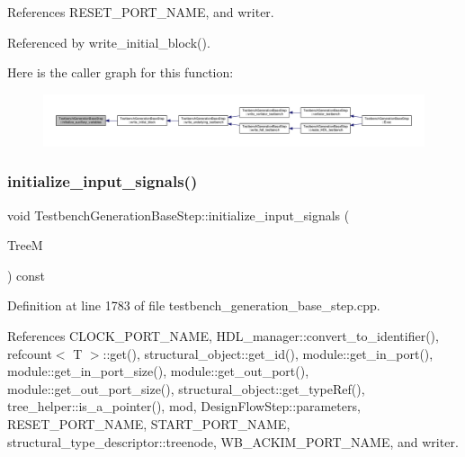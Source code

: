 References R\+E\+S\+E\+T\+\_\+\+P\+O\+R\+T\+\_\+\+N\+A\+ME, and writer.



Referenced by write\+\_\+initial\+\_\+block().

Here is the caller graph for this function\+:
\nopagebreak
\begin{figure}[H]
\begin{center}
\leavevmode
\includegraphics[width=350pt]{dc/d02/classTestbenchGenerationBaseStep_a1055ee6f17948449e8ab78c798f4440c_icgraph}
\end{center}
\end{figure}
\mbox{\label{classTestbenchGenerationBaseStep_ab4bb94d28070dd729e236fbb1810c356}} 
\subsubsection{\texorpdfstring{initialize\+\_\+input\+\_\+signals()}{initialize\_input\_signals()}}
{\footnotesize\ttfamily void Testbench\+Generation\+Base\+Step\+::initialize\+\_\+input\+\_\+signals (\begin{DoxyParamCaption}\item[{const \hyperlink{tree__manager_8hpp_a792e3f1f892d7d997a8d8a4a12e39346}{tree\+\_\+manager\+Const\+Ref}}]{TreeM }\end{DoxyParamCaption}) const\hspace{0.3cm}{\ttfamily [protected]}}



Definition at line 1783 of file testbench\+\_\+generation\+\_\+base\+\_\+step.\+cpp.



References C\+L\+O\+C\+K\+\_\+\+P\+O\+R\+T\+\_\+\+N\+A\+ME, H\+D\+L\+\_\+manager\+::convert\+\_\+to\+\_\+identifier(), refcount$<$ T $>$\+::get(), structural\+\_\+object\+::get\+\_\+id(), module\+::get\+\_\+in\+\_\+port(), module\+::get\+\_\+in\+\_\+port\+\_\+size(), module\+::get\+\_\+out\+\_\+port(), module\+::get\+\_\+out\+\_\+port\+\_\+size(), structural\+\_\+object\+::get\+\_\+type\+Ref(), tree\+\_\+helper\+::is\+\_\+a\+\_\+pointer(), mod, Design\+Flow\+Step\+::parameters, R\+E\+S\+E\+T\+\_\+\+P\+O\+R\+T\+\_\+\+N\+A\+ME, S\+T\+A\+R\+T\+\_\+\+P\+O\+R\+T\+\_\+\+N\+A\+ME, structural\+\_\+type\+\_\+descriptor\+::treenode, W\+B\+\_\+\+A\+C\+K\+I\+M\+\_\+\+P\+O\+R\+T\+\_\+\+N\+A\+ME, and writer.



